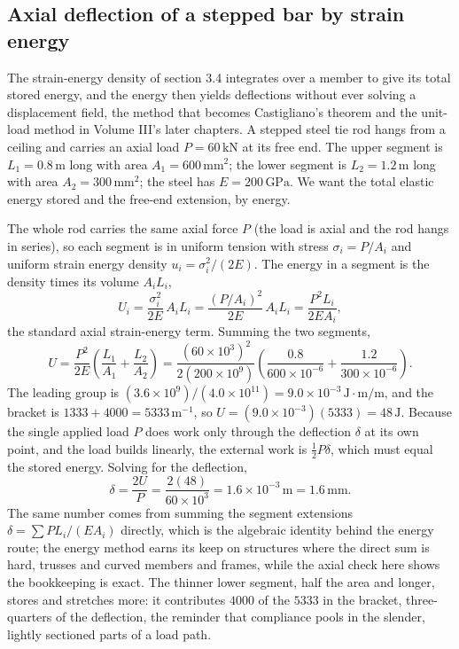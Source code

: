 \subsection{Axial deflection of a stepped bar by strain energy}

The strain-energy density of section 3.4 integrates over a member to give
its total stored energy, and the energy then yields deflections without
ever solving a displacement field, the method that becomes Castigliano's
theorem and the unit-load method in Volume III's later chapters. A
stepped steel tie rod hangs from a ceiling and carries an axial load $P =
60\,\text{kN}$ at its free end. The upper segment is $L_1 = 0.8\,\si{
\meter}$ long with area $A_1 = 600\,\si{\milli\meter}^2$; the lower
segment is $L_2 = 1.2\,\si{\meter}$ long with area $A_2 = 300\,\si{
\milli\meter}^2$; the steel has $E = 200\,\text{GPa}$. We want the total
elastic energy stored and the free-end extension, by energy.

The whole rod carries the same axial force $P$ (the load is axial and the
rod hangs in series), so each segment is in uniform tension with stress
$\sigma_i = P/A_i$ and uniform strain energy density $u_i = \sigma_i^2/
(2E)$. The energy in a segment is the density times its volume $A_i L_i$,
\[
U_i = \frac{\sigma_i^2}{2E}\,A_i L_i = \frac{(P/A_i)^2}{2E}\,A_i L_i =
\frac{P^2 L_i}{2 E A_i},
\]
the standard axial strain-energy term. Summing the two segments,
\[
U = \frac{P^2}{2E}\left(\frac{L_1}{A_1} + \frac{L_2}{A_2}\right) =
\frac{(60\times 10^3)^2}{2(200\times 10^9)}\left(\frac{0.8}{600\times
10^{-6}} + \frac{1.2}{300\times 10^{-6}}\right).
\]
The leading group is $(3.6\times 10^9)/(4.0\times 10^{11}) = 9.0\times
10^{-3}\,\text{J}\cdot\text{m}/\text{m}$, and the bracket is $1333 + 4000
= 5333\,\text{m}^{-1}$, so $U = (9.0\times 10^{-3})(5333) = 48\,\text{J}$.
Because the single applied load $P$ does work only through the deflection
$\delta$ at its own point, and the load builds linearly, the external
work is $\tfrac{1}{2}P\delta$, which must equal the stored energy. Solving
for the deflection,
\[
\delta = \frac{2U}{P} = \frac{2(48)}{60\times 10^3} = 1.6\times 10^{-3}\,
\si{\meter} = 1.6\,\si{\milli\meter}.
\]
The same number comes from summing the segment extensions $\delta =
\sum P L_i/(E A_i)$ directly, which is the algebraic identity behind the
energy route; the energy method earns its keep on structures where the
direct sum is hard, trusses and curved members and frames, while the
axial check here shows the bookkeeping is exact. The thinner lower
segment, half the area and longer, stores and stretches more: it
contributes $4000$ of the $5333$ in the bracket, three-quarters of the
deflection, the reminder that compliance pools in the slender, lightly
sectioned parts of a load path.

